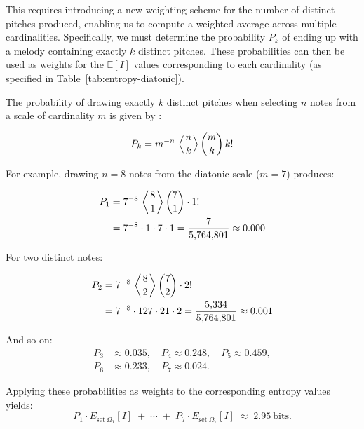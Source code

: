 \documentclass[10pt,twocolumn]{article}
\numberwithin{equation}{section} %
\begin{document}
    This requires introducing a new weighting scheme for the number of distinct pitches produced, enabling us to compute a weighted average across multiple cardinalities.
    Specifically, we must determine the probability $P_k$ of ending up with a melody containing exactly $k$ distinct pitches.
    These probabilities can then be used as weights for the $\mathbb{E}[I]$ values corresponding to each cardinality (as specified in Table~\ref{tab:entropy-diatonic}).

    The probability of drawing exactly $k$ distinct pitches when selecting $n$ notes from a scale of cardinality $m$ is given by \citet{Feller1968}:

    \begin{equation}
        P_k = m^{-n} \, \left\langle \genfrac{}{}{0pt}{}{n}{k} \right\rangle \binom{m}{k} \, k!
        \label{eq:Pk}
    \end{equation}

    For example, drawing $n = 8$ notes from the diatonic scale ($m = 7$) produces:

    \begin{align*}
        P_1 &= 7^{-8} \, \left\langle \genfrac{}{}{0pt}{}{8}{1} \right\rangle \binom{7}{1} \cdot 1! \\
        &= 7^{-8} \cdot 1 \cdot 7 \cdot 1
        = \frac{7}{5{,}764{,}801} \approx 0.000
    \end{align*}

    For two distinct notes:

    \begin{align*}
        P_2 &= 7^{-8} \, \left\langle \genfrac{}{}{0pt}{}{8}{2} \right\rangle \binom{7}{2} \cdot 2! \\
        &= 7^{-8} \cdot 127 \cdot 21 \cdot 2
        = \frac{5{,}334}{5{,}764{,}801} \approx 0.001
    \end{align*}

    And so on:
    \begin{align*}
        P_3 &\approx 0.035, \quad
        P_4 \approx 0.248, \quad
        P_5 \approx 0.459, \\
        P_6 &\approx 0.233, \quad
        P_7 \approx 0.024.
    \end{align*}

    Applying these probabilities as weights to the corresponding entropy values yields:
    \[
        P_1 \cdot E_{\text{set}~\Omega_1}[I] \;+\; \cdots \;+\; P_7 \cdot E_{\text{set}~\Omega_7}[I]
        \;\approx\; 2.95 \ \text{bits}.
    \]
\end{document}
